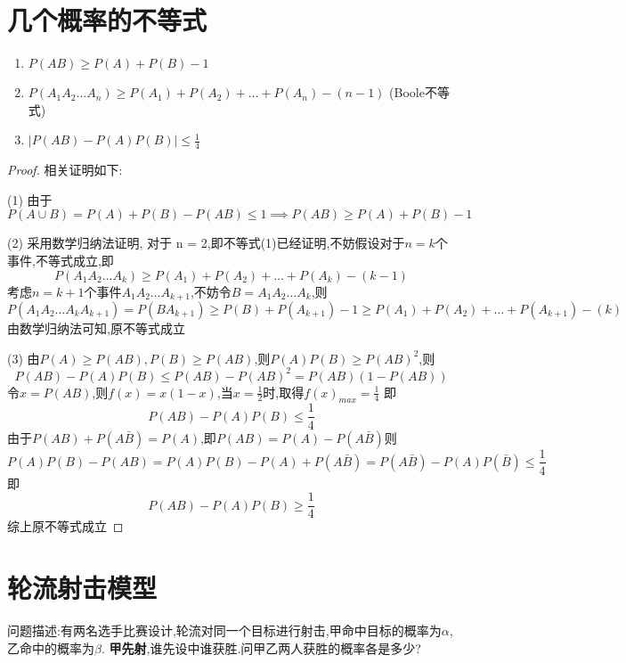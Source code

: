 \documentclass[12pt, a4paper, oneside, UTF8]{ctexbook}
\begin{document}
\section{几个概率的不等式}
    \begin{enumerate}
        \item $P(AB)\geq P(A) + P(B) - 1$
        \item $P(A_1A_2\ldots A_n) \geq P(A_1) + P(A_2) + \ldots + P(A_n) - (n-1)$ (Boole不等式)
        \item $\left|P(AB)-P(A)P(B)\right| \leq \frac{1}{4}$
    \end{enumerate}
    \begin{proof}
        \color{blue}
        相关证明如下:
        \item [(1)]  由于$P(A\cup B)=P(A)+P(B)-P(AB)\leq 1\implies P(AB)\geq P(A) + P(B) - 1$
        \item [(2)]  采用数学归纳法证明, 对于 n = 2,即不等式(1)已经证明,不妨假设对于$n=k$个事件,不等式成立,即
        \[
        P(A_1A_2\ldots A_k)\geq P(A_1)+P(A_2)+\ldots +P(A_k) - (k - 1) 
        \]
        考虑$n=k+1$个事件$A_1A_2\ldots A_{k+1}$,不妨令$B=A_1A_2\ldots A_k$,则
        \[
        P(A_1A_2\ldots A_kA_{k+1})=P(BA_{k+1})\geq P(B) + P(A_{k+1}) - 1 \geq P(A_1)+P(A_2)+\ldots + P(A_{k+1}) - (k) 
        \]
        由数学归纳法可知,原不等式成立
        \item [(3)] 
        由$P(A)\geq P(AB), P(B)\geq P(AB)$,则$P(A)P(B)\geq P(AB)^2$,则
        \[
        P(AB)-P(A)P(B)\leq P(AB)-P(AB)^2 = P(AB)(1-P(AB))
        \]
        令$x=P(AB)$,则$f(x)=x(1-x)$,当$x=\frac{1}{2}$时,取得$f(x)_{max}=\frac{1}{4}$
        即
        \[
        P(AB) - P(A)P(B) \leq \frac{1}{4} 
        \]
        由于$P(AB)+P(A\bar{B})=P(A)$,即$P(AB)=P(A)-P(A\bar{B})$则
        \[
        P(A)P(B)-P(AB)=P(A)P(B)-P(A)+P(A\bar{B}) = P(A\bar{B})-P(A)P(\bar{B}) \leq \frac{1}{4} 
        \]
        即
        \[
        P(AB) - P(A)P(B) \geq \frac{1}{4} 
        \]
        综上原不等式成立
    \end{proof}
\section{轮流射击模型}
    问题描述:有两名选手比赛设计,轮流对同一个目标进行射击,甲命中目标的概率为$\alpha$,乙命中的概率为$\beta$.
    \textbf{甲先射},谁先设中谁获胜.问甲乙两人获胜的概率各是多少?
\end{document}
